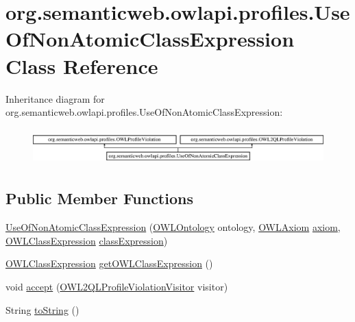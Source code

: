 \hypertarget{classorg_1_1semanticweb_1_1owlapi_1_1profiles_1_1_use_of_non_atomic_class_expression}{\section{org.\-semanticweb.\-owlapi.\-profiles.\-Use\-Of\-Non\-Atomic\-Class\-Expression Class Reference}
\label{classorg_1_1semanticweb_1_1owlapi_1_1profiles_1_1_use_of_non_atomic_class_expression}
}
Inheritance diagram for org.\-semanticweb.\-owlapi.\-profiles.\-Use\-Of\-Non\-Atomic\-Class\-Expression\-:\begin{figure}[H]
\begin{center}
\leavevmode
\includegraphics[height=1.421320cm]{classorg_1_1semanticweb_1_1owlapi_1_1profiles_1_1_use_of_non_atomic_class_expression}
\end{center}
\end{figure}
\subsection*{Public Member Functions}
\begin{DoxyCompactItemize}
\item 
\hyperlink{classorg_1_1semanticweb_1_1owlapi_1_1profiles_1_1_use_of_non_atomic_class_expression_ac516edaa12c64bac2768eab00c3bc124}{Use\-Of\-Non\-Atomic\-Class\-Expression} (\hyperlink{interfaceorg_1_1semanticweb_1_1owlapi_1_1model_1_1_o_w_l_ontology}{O\-W\-L\-Ontology} ontology, \hyperlink{interfaceorg_1_1semanticweb_1_1owlapi_1_1model_1_1_o_w_l_axiom}{O\-W\-L\-Axiom} \hyperlink{classorg_1_1semanticweb_1_1owlapi_1_1profiles_1_1_o_w_l_profile_violation_aa7c8e8910ed3966f64a2c003fb516214}{axiom}, \hyperlink{interfaceorg_1_1semanticweb_1_1owlapi_1_1model_1_1_o_w_l_class_expression}{O\-W\-L\-Class\-Expression} \hyperlink{classorg_1_1semanticweb_1_1owlapi_1_1profiles_1_1_use_of_non_atomic_class_expression_a0588c5608c078b0638dc8cb2ae4c8af8}{class\-Expression})
\item 
\hyperlink{interfaceorg_1_1semanticweb_1_1owlapi_1_1model_1_1_o_w_l_class_expression}{O\-W\-L\-Class\-Expression} \hyperlink{classorg_1_1semanticweb_1_1owlapi_1_1profiles_1_1_use_of_non_atomic_class_expression_aa0670e6225bbdcebb95e17769743c15e}{get\-O\-W\-L\-Class\-Expression} ()
\item 
void \hyperlink{classorg_1_1semanticweb_1_1owlapi_1_1profiles_1_1_use_of_non_atomic_class_expression_ae8c291f8ed1df16468184c6da9f66102}{accept} (\hyperlink{interfaceorg_1_1semanticweb_1_1owlapi_1_1profiles_1_1_o_w_l2_q_l_profile_violation_visitor}{O\-W\-L2\-Q\-L\-Profile\-Violation\-Visitor} visitor)
\item 
String \hyperlink{classorg_1_1semanticweb_1_1owlapi_1_1profiles_1_1_use_of_non_atomic_class_expression_a53ff96fdef2bbdd96960e450d0f921a3}{to\-String} ()
\end{DoxyCompactItemize}
